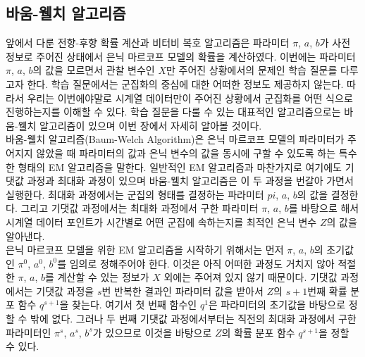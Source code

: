 \documentclass[a4paper]{oblivoir}
\begin{document}
\subsection{바움-웰치 알고리즘}

앞에서 다룬 전향-후향 확률 계산과 비터비 복호 알고리즘은 파라미터 $\pi$, $a$, $b$가 사전 정보로 주어진 상태에서 은닉 마르코프 모델의 확률을 계산하였다. 이번에는 파라미터 $\pi$, $a$, $b$의 값을 모르면서 관찰 변수인 $X$만 주어진 상황에서의 문제인 학습 질문를 다루고자 한다. 학습 질문에서는 군집화의 중심에 대한 어떠한 정보도 제공하지 않는다. 따라서 우리는 이번에야말로 시계열 데이터만이 주어진 상황에서 군집화를 어떤 식으로 진행하는지를 이해할 수 있다. 학습 질문을 다룰 수 있는 대표적인 알고리즘으로는 바움-웰치 알고리즘이 있으며 이번 장에서 자세히 알아볼 것이다. \\

바움-웰치 알고리즘(Baum-Welch Algorithm)은 은닉 마르코프 모델의 파라미터가 주어지지 않았을 때 파라미터의 값과 은닉 변수의 값을 동시에 구할 수 있도록 하는 특수한 형태의 EM 알고리즘을 말한다. 일반적인 EM 알고리즘과 마찬가지로 여기에도 기댓값 과정과 최대화 과정이 있으며 바움-웰치 알고리즘은 이 두 과정을 번갈아 가면서 실행한다. 최대화 과정에서는 군집의 형태를 결정하는 파라미터 $pi$, $a$, $b$의 값을 결정한다. 그리고 기댓값 과정에서는 최대화 과정에서 구한 파라미터 $\pi$, $a$, $b$를 바탕으로 해서 시계열 데이터 포인트가 시간별로 어떤 군집에 속하는지를 최적인 은닉 변수 $Z$의 값을 알아낸다. \\

은닉 마르코프 모델을 위한 EM 알고리즘을 시작하기 위해서는 먼저 $\pi$, $a$, $b$의 초기값인 $\pi^{0}$, $a^{0}$, $b^{0}$를 임의로 정해주어야 한다. 이것은 아직 어떠한 과정도 거치지 않아 적절한 $\pi$, $a$, $b$를 계산할 수 있는 정보가 $X$ 외에는 주어져 있지 않기 때문이다. 기댓값 과정에서는 기댓값 과정을 $s$번 반복한 결과인 파라미터 값을 받아서 $Z$의 $s+1$번째 확률 분포 함수 $q^{s+1}$을 찾는다. 여기서 첫 번째 함수인 $q^1$은 파라미터의 초기값을 바탕으로 정할 수 밖에 없다. 그러나 두 번째 기댓값 과정에서부터는 직전의 최대화 과정에서 구한 파라미터인 $\pi^{s}$, $a^{s}$, $b^{s}$가 있으므로 이것을 바탕으로 $Z$의 확률 분포 함수 $q^{s+1}$을 정할 수 있다.  \\
\end{document}

